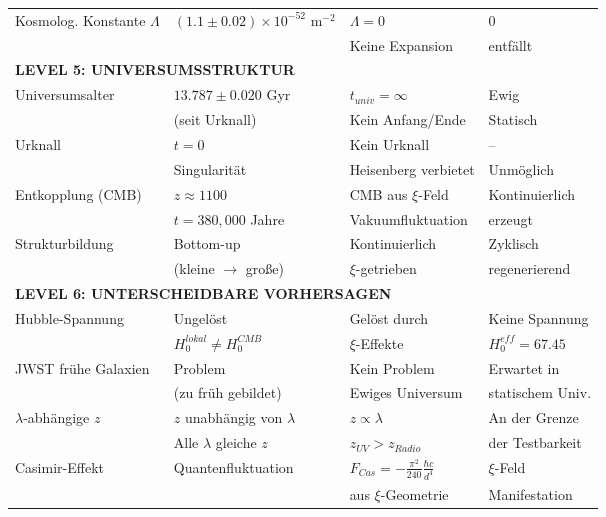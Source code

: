 \documentclass[12pt,a4paper]{article}
\begin{document}
\begin{longtable}{p{4.5cm}p{3.5cm}p{3.5cm}p{3.5cm}}
		Kosmolog. Konstante $\Lambda$ & $(1.1 \pm 0.02) \times 10^{-52}$ m$^{-2}$ & $\Lambda = 0$ & $0$ \\
		& & Keine Expansion & entfällt \\[0.3em]
		
		\midrule
		\multicolumn{4}{l}{\textbf{LEVEL 5: UNIVERSUMSSTRUKTUR}} \\
		\midrule
		
		Universumsalter & $13.787 \pm 0.020$ Gyr & $t_{univ} = \infty$ & Ewig \\
		& (seit Urknall) & Kein Anfang/Ende & Statisch \\[0.3em]
		
		Urknall & $t = 0$ & Kein Urknall & -- \\
		& Singularität & Heisenberg verbietet & Unmöglich \\[0.3em]
		
		Entkopplung (CMB) & $z \approx 1100$ & CMB aus $\xi$-Feld & Kontinuierlich \\
		& $t = 380,000$ Jahre & Vakuumfluktuation & erzeugt \\[0.3em]
		
		Strukturbildung & Bottom-up & Kontinuierlich & Zyklisch \\
		& (kleine $\to$ große) & $\xi$-getrieben & regenerierend \\[0.3em]
		
		\midrule
		\multicolumn{4}{l}{\textbf{LEVEL 6: UNTERSCHEIDBARE VORHERSAGEN}} \\
		\midrule
		
		Hubble-Spannung & Ungelöst & Gelöst durch & Keine Spannung \\
		& $H_0^{lokal} \neq H_0^{CMB}$ & $\xi$-Effekte & $H_0^{eff} = 67.45$ \\[0.3em]
		
		JWST frühe Galaxien & Problem & Kein Problem & Erwartet in \\
		& (zu früh gebildet) & Ewiges Universum & statischem Univ. \\[0.3em]
		
		$\lambda$-abhängige $z$ & $z$ unabhängig von $\lambda$ & $z \propto \lambda$ & An der Grenze \\
		& Alle $\lambda$ gleiche $z$ & $z_{UV} > z_{Radio}$ & der Testbarkeit \\[0.3em]
		
		Casimir-Effekt & Quantenfluktuation & $F_{Cas} = -\frac{\pi^2}{240} \frac{\hbar c}{d^4}$ & $\xi$-Feld \\
		& & aus $\xi$-Geometrie & Manifestation \\[0.3em]
		

\end{longtable}
\end{document}
